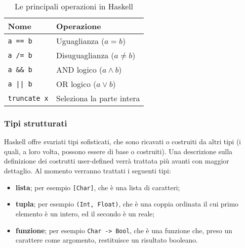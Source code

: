 \begin{table}[htb]
    \begin{center}
        \begin{tabular}{|l | l|}
            \hline
            Nome & Operazione \\
            \hline
            \texttt{a == b} & Uguaglianza ($a = b$) \\
            \texttt{a /= b} & Disuguaglianza ($a \ne b$) \\
            \texttt{a \&\& b} & AND logico ($a \land b$) \\
            \texttt{a || b} & OR logico ($a \lor b$) \\
            \texttt{truncate x} & Seleziona la parte intera \\
            \hline
        \end{tabular}
        \caption{Le principali operazioni in Haskell}
        \label{tab:funprog-operazionibase}
    \end{center}
\end{table}

\subsubsection{Tipi strutturati}
Haskell offre svariati tipi sofisticati, che sono ricavati o costruiti da 
altri tipi (i quali, a loro volta, possono essere di base o costruiti). Una descrizione sulla definizione 
dei costrutti user-defined verr\`{a} trattata pi\`u avanti con maggior dettaglio. Al momento verranno trattati i seguenti tipi:
\begin{itemize}
    \item \textbf{lista}; per esempio \verb"[Char]", che \`e una lista 
    di caratteri;
    \item \textbf{tupla}; per esempio \verb"(Int, Float)", che \`e una 
    coppia ordinata il cui primo elemento \`e un intero, ed il secondo \`e un 
    reale;
    \item \textbf{funzione}; per esempio \verb"Char -> Bool", che \`e
    una funzione che, preso un carattere come argomento, restituisce un 
    risultato booleano.
\end{itemize}

